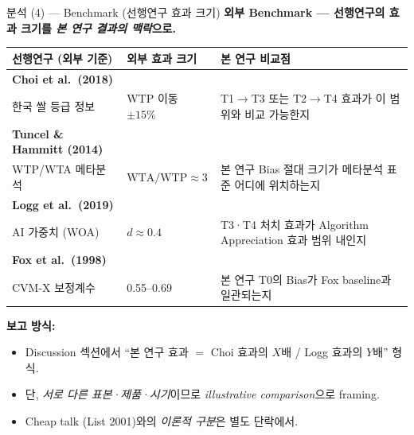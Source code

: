 \documentclass[aspectratio=169]{beamer}
\begin{document}
\begin{frame}{분석 (4) --- Benchmark  (선행연구 효과 크기)}
  \textbf{외부 Benchmark --- 선행연구의 효과 크기를 \emph{본 연구 결과의 맥락}으로.}

  \vspace{0.4em}
  \scriptsize
  \begin{tabular}{p{3.2cm}|p{3.0cm}|p{5.4cm}}
    \hline
    \textbf{선행연구 (외부 기준)} & \textbf{외부 효과 크기} & \textbf{본 연구 비교점} \\
    \hline
    \textbf{Choi et al.\ (2018)}\\한국 쌀 등급 정보 & WTP 이동 $\pm 15\%$ & T1$\rightarrow$T3 또는 T2$\rightarrow$T4 효과가 이 범위와 비교 가능한지 \\
    \hline
    \textbf{Tuncel \& Hammitt (2014)}\\WTP/WTA 메타분석 & $\mathrm{WTA}/\mathrm{WTP} \approx 3$ & 본 연구 Bias 절대 크기가 메타분석 표준 어디에 위치하는지 \\
    \hline
    \textbf{Logg et al.\ (2019)}\\AI 가중치 (WOA) & $d \approx 0.4$ & T3·T4 처치 효과가 Algorithm Appreciation 효과 범위 내인지 \\
    \hline
    \textbf{Fox et al.\ (1998)}\\CVM-X 보정계수 & 0.55--0.69 & 본 연구 T0의 Bias가 Fox baseline과 일관되는지 \\
    \hline
  \end{tabular}

  \vspace{0.5em}
  \small
  \textbf{보고 방식:}
  \begin{itemize}\itemsep0.05em
    \item Discussion 섹션에서 ``본 연구 효과 $=$ Choi 효과의 $X$배 / Logg 효과의 $Y$배'' 형식.
    \item 단, \emph{서로 다른 표본·제품·시기}이므로 \emph{illustrative comparison}으로 framing.
    \item Cheap talk (List 2001)와의 \emph{이론적 구분}은 별도 단락에서.
  \end{itemize}

  \vspace{0.2em}
\end{frame}
\end{document}
